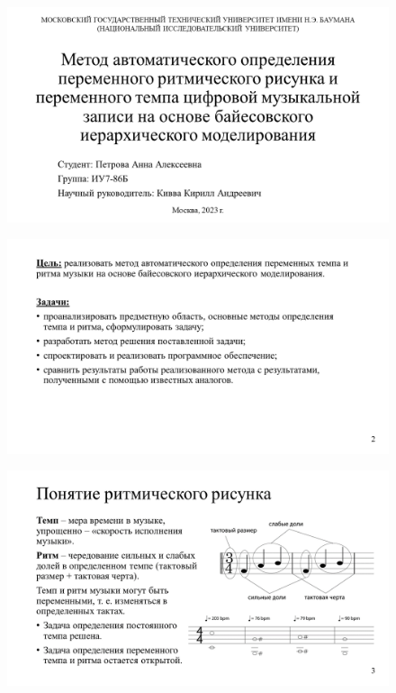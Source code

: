 
\begin{figure}[h!]
	\begin{center}
		\includegraphics[angle=90,scale=0.65]{slides/Slide1.png}
	\end{center}
\end{figure}

\begin{figure}[h!]
	\begin{center}
		\includegraphics[angle=90,scale=0.75]{slides/Slide2.png}
	\end{center}
\end{figure}

\begin{figure}[h!]
	\begin{center}
		\includegraphics[angle=90,scale=0.75]{slides/Slide3.png}
	\end{center}
\end{figure}

